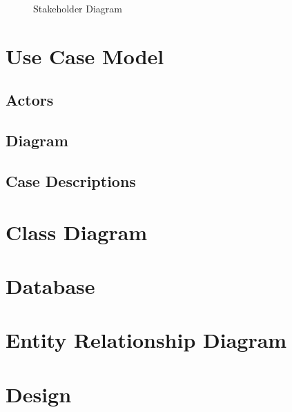 \documentclass[a4paper]{article}
\begin{document}
\begin{figure}[!ht]
    \centering
    \caption{Stakeholder Diagram}
    \label{fig:stakeholder}
\end{figure}

\section{Use Case Model}

\subsection{Actors}

\subsection{Diagram}

\subsection{Case Descriptions}

\section{Class Diagram}

\section{Database}
\section{Entity Relationship Diagram}

\section{Design}
\end{document}
